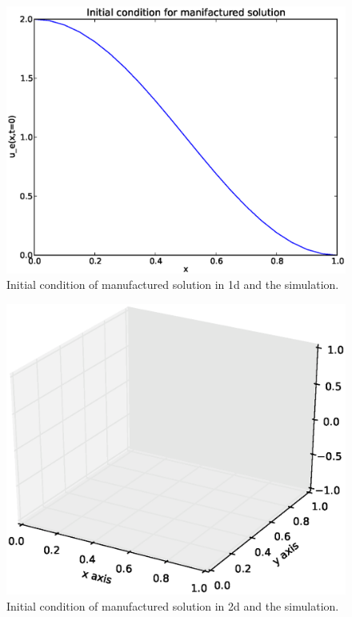 \begin{figure}[H]
 \centering
 \includegraphics[scale=0.7]{../doc/results/experiment_31102013_1017/results/initial_condition.eps}
 \caption[Initial condition in 1d]{Initial condition of manufactured solution in 1d and the simulation.}
 \label{initial_condition_1d}
\end{figure}
\begin{figure}[H]
 \centering
 \includegraphics[scale=0.7]{Figures/InitialCondition2d.eps}
 \caption[Initial condition in 2d]{Initial condition of manufactured solution in 2d and the simulation.}
 \label{initial_condition_2d}
\end{figure}
